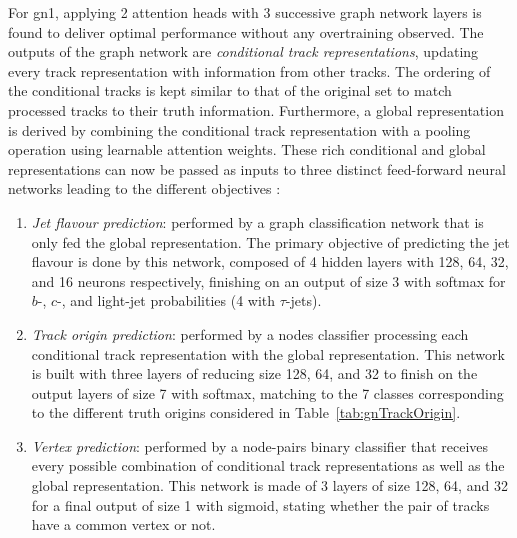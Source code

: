 For \gls{gn1}, applying 2 attention heads with 3 successive graph network layers is found to deliver optimal performance without any overtraining observed. The outputs of the graph network are \textit{conditional track representations}, updating every track representation with information from other tracks. The ordering of the conditional tracks is kept similar to that of the original set to match processed tracks to their truth information. Furthermore, a global representation is derived by combining the conditional track representation with a pooling operation using learnable attention weights. These rich conditional and global representations can now be passed as inputs to three distinct feed-forward neural networks leading to the different objectives \cite{ATL-PHYS-PUB-2022-027}:
\begin{enumerate}
  \item \textit{Jet flavour prediction}: performed by a graph classification network that is only fed the global representation. The primary objective of predicting the jet flavour is done by this network, composed of 4 hidden layers with 128, 64, 32, and 16 neurons respectively, finishing on an output of size 3 with softmax for $b$-, $c$-, and light-jet probabilities (4 with $\tau$-jets).
  \item \textit{Track origin prediction}: performed by a nodes classifier processing each conditional track representation with the global representation. This network is built with three layers of reducing size 128, 64, and 32 to finish on the output layers of size 7 with softmax, matching to the 7 classes corresponding to the different truth origins considered in Table~\ref{tab:gnTrackOrigin}.
  \item \textit{Vertex prediction}: performed by a node-pairs binary classifier that receives every possible combination of conditional track representations as well as the global representation. This network is made of 3 layers of size 128, 64, and 32 for a final output of size 1 with sigmoid, stating whether the pair of tracks have a common vertex or not. 
\end{enumerate}

